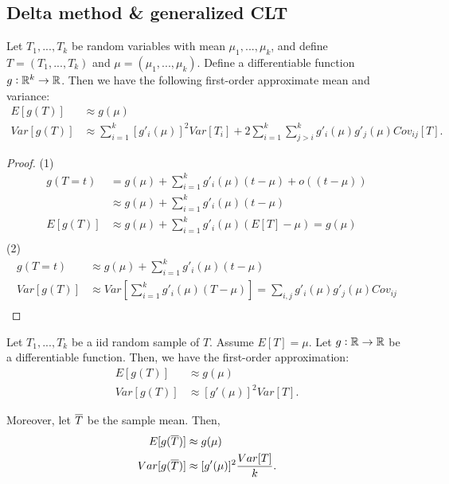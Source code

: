 \begin{refsection}
\subsection{Delta method \& generalized CLT}
\begin{lemma}\cite[242]{casella2002statistical}
Let $T_1,...,T_k$ be random variables with mean $\mu_1,...,\mu_k$, and define $T=(T_1,...,T_k)$ and $\mu = (\mu_1,...,\mu_k)$. Define a differentiable function $g:\mathbb{R}^k\to \mathbb{R}$. Then we have the following first-order approximate mean and variance:
\begin{align*}
E[g(T)] &\approx g(\mu)\\
Var[g(T)] &\approx \sum_{i=1}^k [g'_i(\mu)]^2 Var[T_i] + 2\sum_{i=1}^{k}\sum_{j > i}^k g'_i(\mu)g'_j(\mu) Cov_{ij}[T].
\end{align*}
\end{lemma}
\begin{proof}
(1)
\begin{align*}
g(T = t) &= g(\mu) + \sum_{i=1}^k g'_i(\mu)(t - \mu) + o((t-\mu))\\
		&\approx g(\mu) + \sum_{i=1}^k g'_i(\mu)(t - \mu)\\
	E[g(T)] &\approx g(\mu) + 	\sum_{i=1}^k g'_i(\mu)(E[T] - \mu) = g(\mu) \\
\end{align*}
(2)
\begin{align*}
g(T = t) &\approx g(\mu) + \sum_{i=1}^k g'_i(\mu)(t - \mu) \\
Var[g(T)] &\approx Var[\sum_{i=1}^k g'_i(\mu)(T - \mu)] = \sum_{i,j}g'_i(\mu)g'_j(\mu)Cov_{ij} \\
\end{align*}
\end{proof}

\begin{corollary}
Let $T_1,...,T_k$ be a iid random sample of $T$. Assume $E[T] = \mu$. Let $g:\mathbb{R} \to \mathbb{R}$ be a differentiable function. Then, we have the first-order approximation:
\begin{align*}
E[g(T)] &\approx g(\mu)\\
Var[g(T)] &\approx [g'(\mu)]^2 Var[T].
\end{align*}

Moreover, let $\overline{T}$ be the sample mean. Then, 
\begin{align*}
E[g(\overline{T})] &\approx g(\mu)\\
Var[g(\overline{T})] &\approx [g'(\mu)]^2 \frac{Var[T]}{k}.
\end{align*}
\end{corollary}


\end{refsection}
